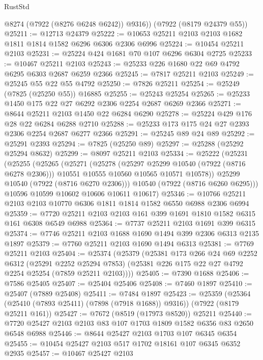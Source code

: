 \begin{lexlean}{RustStd}
\begin{coremodule}
        @8274
        (@7922 (@8276 @6248 @6242))
        @9316))
    (@7922 (@8179 @24379 @55))
@25211 := @12713 @24379
@25222 := @10653 @25211 @2103 @2103 @1682 @1811 @1814 @1582 @6296 @6306 @2306 @6996
@25224 := @10454 @25211 @2103
@25231 := @25224 @424 @1681 @70 @107 @6296 @6304 @2725
@25233 := @10467 @25211 @2103
@25243 := @25233 @226 @1680 @22 @69 @4792 @6295 @6303 @2687 @6259 @2366
@25245 := @7817 @25211 @2103
@25249 := @25245 @55 @22 @55 @4792
@25250 := @7826 @25211
@25254 := @25249 (@7825 (@25250 @55)) @16885
@25255 := @25243 @25254
@25265 := @25233 @1450 @175 @22 @27 @6292 @2306 @2254 @2687 @6269 @2366
@25271 := @8644 @25211 @2103 @1450 @22 @6284 @6290
@25278 := @25224 @429 @176 @28 @22 @6284 @6288 @2710
@25288 := @25233 @173 @175 @24 @27 @2393 @2306 @2254 @2687 @6277 @2366
@25291 := @25245 @89 @24 @89
@25292 := @25291 @2393
@25294 := @7825 (@25250 @89)
@25297 := @25288 (@25292 @25294 @8632)
@25299 := @8097 @25211 @2103
@25334 := @25222
    (@25231
      (@25255
        (@25265
          (@25271
            (@25278
              (@25297 @25299 @10540 (@7922 (@8716 @6278 @2306)))
              @10551
              @10555
              @10560
              @10565
              @10571
              @10578))
          @25299
          @10540
          (@7922 (@8716 @6270 @2306)))
        @10540
        (@7922 (@8716 @6260 @6295)))
      @10596
      @10599
      @10602
      @10606
      @10611
      @10617)
@25346 := @10766 @25211 @2103 @2103 @10770 @6306 @1811 @1814 @1582 @6550 @6988 @2306 @6994
@25359 := @7720 @25211 @2103 @2103 @161 @399 @1691 @1810 @1582 @6315 @161 @6308 @6549 @6988
@25364 := @7737 @25211 @2103 @1691 @399 @6315
@25374 := @7746 @25211 @2103 @1688 @1690 @1494 @399 @2306 @6313 @2135 @1897
@25379 := @7760 @25211 @2103 @1690 @1494 @6313
@25381 := @7769 @25211 @2103
@25404 := @25374
    (@25379
      (@25381
        @173
        @266
        @24
        @69
        @2252
        @6312
        (@25291 @2252 @25294 @7853)
        (@25381 @226 @175 @22 @27 @4792 @2254 @25254 (@7859 @25211 @2103))))
@25405 := @7390 @1688
@25406 := @7586 @25405
@25407 := @25404 @25406
@25408 := @7460 @1897
@25410 := @25407 (@7889 @25408)
@25411 := @7484 @1897
@25423 := @25359
    (@25364 (@25410 (@7893 @25411) (@7898 (@7918 @1688)) @9316))
    (@7922 (@8179 @25211 @161))
@25427 := @7672 (@8519 (@17973 @8520)) @25211
@25440 := @7720 @25427 @2103 @2103 @83 @107 @1703 @1809 @1582 @6356 @83 @2650 @6548 @6988
@25446 := @8644 @25427 @2103 @1703 @107 @6345 @6354
@25455 := @10454 @25427 @2103 @517 @1702 @18161 @107 @6345 @6352 @2935
@25457 := @10467 @25427 @2103

\end{coremodule}
\end{lexlean}
